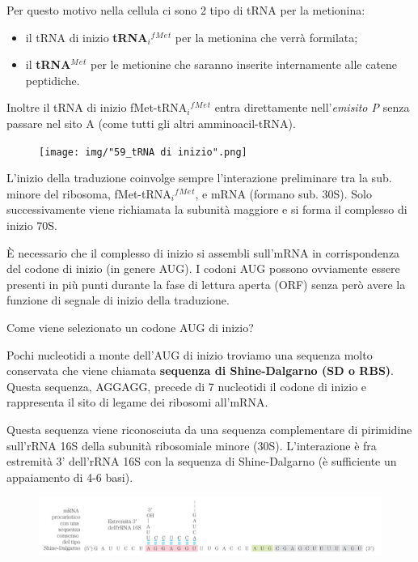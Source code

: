 \documentclass[11pt]{book}
\begin{document}
Per questo motivo nella cellula ci sono 2 tipo di tRNA per la metionina:

\begin{itemize}
\itemsep1pt\parskip0pt
\item
  il tRNA di inizio \textbf{tRNA\(_i\)\(^f\)\(^M\)\(^e\)\(^t\)} per la
  metionina che verrà formilata;
\item
  il \textbf{tRNA\(^M\)\(^e\)\(^t\)} per le metionine che saranno
  inserite internamente alle catene peptidiche.
\end{itemize}

Inoltre il tRNA di inizio fMet-tRNA\(_i\)\(^f\)\(^M\)\(^e\)\(^t\) entra
direttamente nell'\emph{emisito P} senza passare nel sito A (come tutti
gli altri amminoacil-tRNA).

\begin{figure}[htp]
\centering
\texttt{[image: img/"59\_tRNA di inizio".png]}
\caption{}
\label{trna-di-inizio}
\end{figure}

L'inizio della traduzione coinvolge sempre l'interazione preliminare tra
la sub. minore del ribosoma, fMet-tRNA\(_i\)\(^f\)\(^M\)\(^e\)\(^t\), e
mRNA (formano sub. 30S). Solo successivamente viene richiamata la
subunità maggiore e si forma il complesso di inizio 70S.

È necessario che il complesso di inizio si assembli sull'mRNA in
corrispondenza del codone di inizio (in genere AUG). I codoni AUG
possono ovviamente essere presenti in più punti durante la fase di
lettura aperta (ORF) senza però avere la funzione di segnale di inizio
della traduzione.

Come viene selezionato un codone AUG di inizio?

Pochi nucleotidi a monte dell'AUG di inizio troviamo una sequenza molto
conservata che viene chiamata \textbf{sequenza di Shine-Dalgarno (SD o
RBS)}. Questa sequenza, AGGAGG, precede di 7 nucleotidi il codone di
inizio e rappresenta il sito di legame dei ribosomi all'mRNA.

Questa sequenza viene riconosciuta da una sequenza complementare di
pirimidine sull'rRNA 16S della subunità ribosomiale minore (30S).
L'interazione è fra estremità 3' dell'rRNA 16S con la sequenza di
Shine-Dalgarno (è sufficiente un appaiamento di 4-6 basi).

\begin{figure}[htp]
\centering
\includegraphics[scale=1.00]{img/58_Shine-Dalgarno.png}
\caption{}
\label{shine-dalgarno}
\end{figure}
\end{document}
